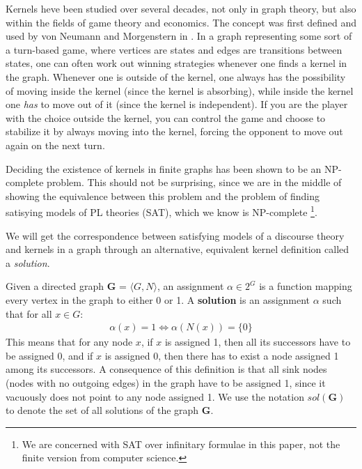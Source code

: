 Kernels heve been studied over several decades, not only in graph theory, but also within the fields of game theory and economics.
The concept was first defined and used by von Neumann and Morgenstern in \cite{neumann}.
In a graph representing some sort of a turn-based game, where vertices are states and edges are transitions between states, one can often work out winning strategies whenever one finds a kernel in the graph.
Whenever one is outside of the kernel, one always has the possibility of moving inside the kernel (since the kernel is absorbing), while inside the kernel one \textit{has} to move out of it (since the kernel is independent).
If you are the player with the choice outside the kernel, you can control the game and choose to stabilize it by always moving into the kernel, forcing the opponent to move out again on the next turn.

Deciding the existence of kernels in finite graphs has been shown to be an NP-complete problem\cite{chvatal}.
This should not be surprising, since we are in the middle of showing the equivalence between this problem and the problem of finding satisying models of PL theories (SAT), which we know is NP-complete \footnote{We are concerned with SAT over infinitary formulae in this paper, not the finite version from computer science.}.

We will get the correspondence between satisfying models of a discourse theory and kernels in a graph through an alternative, equivalent kernel definition called a \textit{solution}.

Given a directed graph \textbf{G} = $\langle G,N \rangle$, an assignment $\alpha \in 2^G$ is a function mapping every vertex in the graph to either 0 or 1.
A \textbf{solution} is an assignment $\alpha$ such that for all $x \in G:$
\begin{align}
  \alpha(x) = 1 \iff \alpha(N(x)) = \{ 0 \}
\end{align}
This means that for any node $x$, if $x$ is assigned 1, then all its successors have to be assigned  0, and if $x$ is assigned 0, then there has to exist a node assigned 1 among its successors.
A consequence of this definition is that all sink nodes (nodes with no outgoing edges) in the graph have to be assigned 1, since it vacuously does not point to any node assigned 1.
We use the notation $sol(\mathbf{G})$ to denote the set of all solutions of the graph \textbf{G}.
